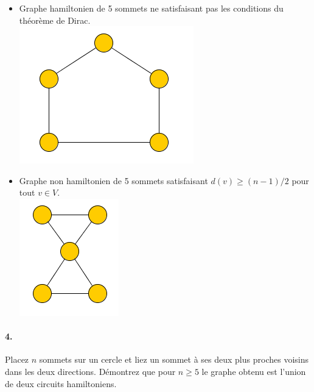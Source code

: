 \begin{solution}
\begin{itemize}
\item Graphe hamiltonien de 5 sommets ne satisfaisant pas les conditions du théorème de Dirac.\\
\includegraphics[scale=0.5]{ape5_ex3_1.png}
\item Graphe non hamiltonien de 5 sommets satisfaisant $d(v) \geq (n-1)/2$ pour tout $v \in V$.\\
\includegraphics[scale=0.5]{ape5_ex3_2.png}
\end{itemize}
\end{solution}

\paragraph{4. } Placez $n$ sommets sur un cercle et liez un sommet à ses deux plus proches voisins dans les deux directions. Démontrez que pour $n \geq 5$ le graphe obtenu est l'union de deux circuits hamiltoniens.

